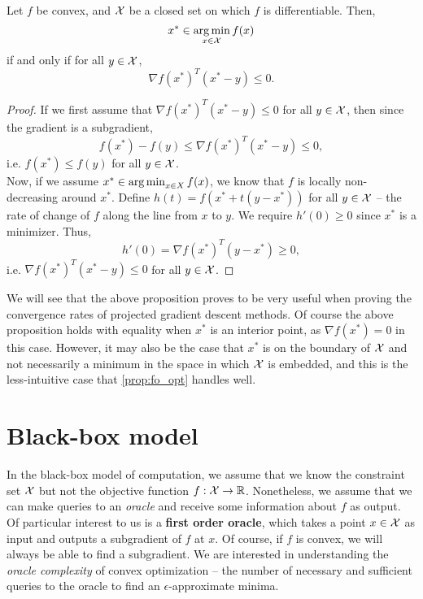\begin{proposition}\label{prop:fo_opt}
Let $f$ be convex, and $\mathcal{X}$ be a closed set on which $f$ is differentiable. Then,
\[
x^* \in \operatorname*{arg\,min}_{x \in \mathcal{X}} f(x)
\]
if and only if for all $y \in \mathcal{X}$,
\[
\nabla f(x^*)^T (x^* - y) \leq 0.
\]
\begin{proof}
If we first assume that $\nabla f(x^*)^T(x^* - y) \leq 0$ for all $y \in \mathcal{X}$, then since the gradient is a subgradient,
\[
f(x^*) - f(y) \leq \nabla f(x^*)^T (x^* - y) \leq 0,
\]
i.e. $f(x^*) \leq f(y)$ for all $y \in \mathcal{X}$. \\

Now, if we assume $x^* \in \operatorname*{arg\,min}_{x \in X}f(x)$, we know that $f$ is locally non-decreasing around $x^*$. Define $h(t) = f(x^* + t(y-x^*))$ for all $y \in \mathcal{X}$ -- the rate of change of $f$ along the line from $x$ to $y$. We require $h'(0) \geq 0$ since $x^*$ is a minimizer. Thus,
\[
h'(0) = \nabla f(x^*)^T (y - x^*) \geq 0, 
\]
i.e. $\nabla f(x^*)^T (x^* - y) \leq 0$ for all $y \in \mathcal{X}$. 
\end{proof}
\end{proposition}

We will see that the above proposition proves to be very useful when proving the convergence rates of projected gradient descent methods. Of course the above proposition holds with equality when $x^*$ is an interior point, as $\nabla f(x^*) = 0$ in this case. However, it may also be the case that $x^*$ is on the boundary of $\mathcal{X}$ and not necessarily a minimum in the space in which $\mathcal{X}$ is embedded, and this is the less-intuitive case that \autoref{prop:fo_opt} handles well.

\section{Black-box model}
In the black-box model of computation, we assume that we know the constraint set $\mathcal{X}$ but not the objective function $f : \mathcal{X} \rightarrow \mathbb{R}$. Nonetheless, we assume that we can make queries to an \emph{oracle} and receive some information about $f$ as output. Of particular interest to us is a \textbf{first order oracle}, which takes a point $x \in \mathcal{X}$ as input and outputs a subgradient of $f$ at $x$. Of course, if $f$ is convex, we will always be able to find a subgradient. We are interested in understanding the \emph{oracle complexity} of convex optimization -- the number of necessary and sufficient queries to the oracle to find an $\epsilon$-approximate minima. 

